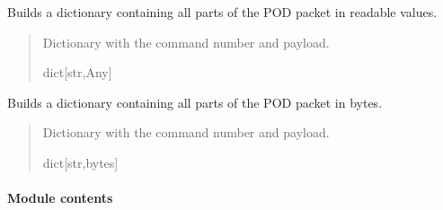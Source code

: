 \documentclass[letterpaper,10pt,english]{sphinxmanual}
\begin{document}
\begin{fulllineitems}
\begin{fulllineitems}
\label{\detokenize{PodApi.Packets:PodApi.Packets.Standard.PacketStandard.TranslateAll}}
\pysigstartsignatures
{}
\pysigstopsignatures
\sphinxAtStartPar
Builds a dictionary containing all parts of the POD packet in readable values.
\begin{quote}\begin{description}
\sphinxAtStartPar
Dictionary with the command number and payload.

\sphinxAtStartPar
dict{[}str,Any{]}

\end{description}\end{quote}

\end{fulllineitems}


\begin{fulllineitems}
\label{\detokenize{PodApi.Packets:PodApi.Packets.Standard.PacketStandard.UnpackAll}}
\pysigstartsignatures
{}
\pysigstopsignatures
\sphinxAtStartPar
Builds a dictionary containing all parts of the POD packet in bytes.
\begin{quote}\begin{description}
\sphinxAtStartPar
Dictionary with the command number and payload.

\sphinxAtStartPar
dict{[}str,bytes{]}

\end{description}\end{quote}

\end{fulllineitems}


\end{fulllineitems}



\paragraph{Module contents}
\label{\detokenize{PodApi.Packets:module-PodApi.Packets}}\label{\detokenize{PodApi.Packets:module-contents}}
\sphinxstepscope
\end{document}
